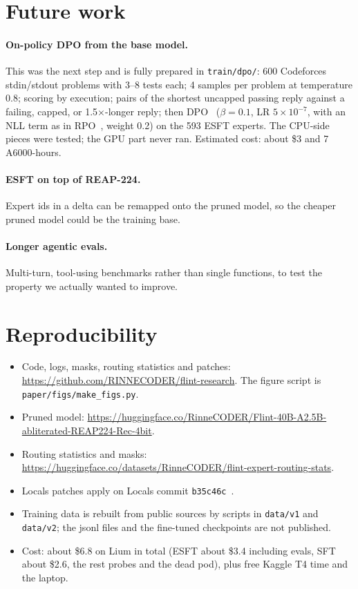 \documentclass[11pt]{article}
\begin{document}
\section{Future work}

\paragraph{On-policy DPO from the base model.} This was the next step and is fully prepared in \texttt{train/dpo/}: 600
Codeforces stdin/stdout problems with 3--8 tests each; 4 samples per problem at temperature 0.8; scoring by execution;
pairs of the shortest uncapped passing reply against a failing, capped, or 1.5$\times$-longer reply; then
DPO~\citep{rafailov2023dpo} ($\beta{=}0.1$, LR $5\times10^{-7}$, with an NLL term as in RPO~\citep{pang2024rpo}, weight 0.2)
on the 593 ESFT experts. The CPU-side pieces were tested; the GPU part never ran. Estimated cost: about \$3 and 7
A6000-hours.

\paragraph{ESFT on top of REAP-224.} Expert ids in a delta can be remapped onto the pruned model, so the cheaper pruned
model could be the training base.

\paragraph{Longer agentic evals.} Multi-turn, tool-using benchmarks rather than single functions, to test the property we
actually wanted to improve.

\section{Reproducibility}
\label{sec:repro}

\begin{itemize}
  \item Code, logs, masks, routing statistics and patches:
        \url{https://github.com/RINNECODER/flint-research}. The figure script is \texttt{paper/figs/make\_figs.py}.
  \item Pruned model: \url{https://huggingface.co/RinneCODER/Flint-40B-A2.5B-abliterated-REAP224-Rec-4bit}.
  \item Routing statistics and masks: \url{https://huggingface.co/datasets/RinneCODER/flint-expert-routing-stats}.
  \item Locals patches apply on Locals commit \texttt{b35c46c}~\citep{locals}.
  \item Training data is rebuilt from public sources by scripts in \texttt{data/v1} and \texttt{data/v2}; the jsonl
        files and the fine-tuned checkpoints are not published.
  \item Cost: about \$6.8 on Lium in total (ESFT about \$3.4 including evals, SFT about \$2.6, the rest probes and the
        dead pod), plus free Kaggle T4 time and the laptop.
\end{itemize}
\end{document}
